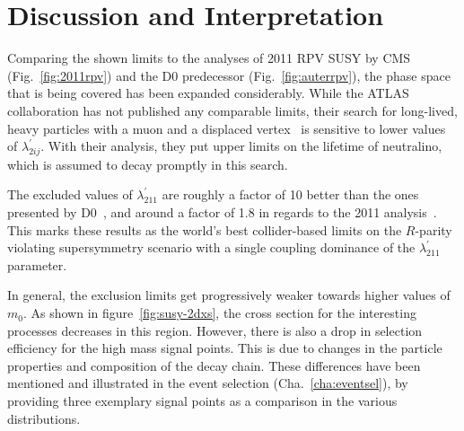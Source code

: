 \section{Discussion and Interpretation}
\label{sec:discussion}

Comparing the shown limits to the analyses of 2011 RPV SUSY by CMS (Fig.~\ref{fig:2011rpv}) and the D0 predecessor (Fig.~\ref{fig:auterrpv}), the phase space that is being covered has been expanded considerably. While the ATLAS collaboration has not published any comparable limits, their search for long-lived, heavy particles with a muon and a displaced vertex~\cite{atlasrpv} is sensitive to lower values of $\lambda^\prime_{2ij}$. With their analysis, they put upper limits on the lifetime of neutralino, which is assumed to decay promptly in this search.

The excluded values of $\lambda^{\prime}_{211}$ are roughly a factor of 10 better than the ones presented by D0~\cite{auter,d0rpv}, and around a factor of 1.8 in regards to the 2011 analysis~\cite{2011rpv}. This marks these results as the world's best collider-based limits on the $R$-parity violating supersymmetry scenario with a single coupling dominance of the $\lambda^{\prime}_{211}$ parameter.

In general, the exclusion limits get progressively weaker towards higher values of $m_0$. As shown in figure~\ref{fig:susy-2dxs}, the cross section for the interesting processes decreases in this region. However, there is also a drop in selection efficiency for the high mass signal points. This is due to changes in the particle properties and composition of the decay chain. These differences have been mentioned and illustrated in the event selection (Cha.~\ref{cha:eventsel}), by providing three exemplary signal points as a comparison in the various distributions.

